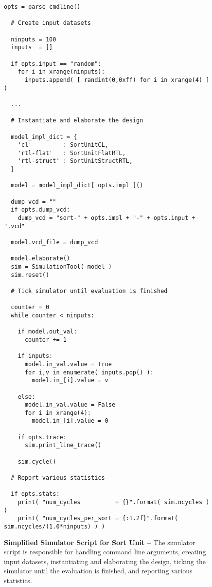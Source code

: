 
\begin{figure}

  \begin{lstlisting}[xleftmargin={0.9in},gobble=2]
  opts = parse_cmdline()

  # Create input datasets

  ninputs = 100
  inputs  = []

  if opts.input == "random":
    for i in xrange(ninputs):
      inputs.append( [ randint(0,0xff) for i in xrange(4) ] )

  ...

  # Instantiate and elaborate the design

  model_impl_dict = {
    'cl'         : SortUnitCL,
    'rtl-flat'   : SortUnitFlatRTL,
    'rtl-struct' : SortUnitStructRTL,
  }

  model = model_impl_dict[ opts.impl ]()

  dump_vcd = ""
  if opts.dump_vcd:
    dump_vcd = "sort-" + opts.impl + "-" + opts.input + ".vcd"

  model.vcd_file = dump_vcd

  model.elaborate()
  sim = SimulationTool( model )
  sim.reset()

  # Tick simulator until evaluation is finished

  counter = 0
  while counter < ninputs:

    if model.out_val:
      counter += 1

    if inputs:
      model.in_val.value = True
      for i,v in enumerate( inputs.pop() ):
        model.in_[i].value = v

    else:
      model.in_val.value = False
      for i in xrange(4):
        model.in_[i].value = 0

    if opts.trace:
      sim.print_line_trace()

    sim.cycle()

  # Report various statistics

  if opts.stats:
    print( "num_cycles          = {}".format( sim.ncycles ) )
    print( "num_cycles_per_sort = {:1.2f}".format( sim.ncycles/(1.0*ninputs) ) )
\end{lstlisting}

  \caption{\textbf{Simplified Simulator Script for Sort Unit --} The
    simulator script is responsible for handling command line arguments,
    creating input datasets, instantiating and elaborating the design,
    ticking the simulator until the evaluation is finished, and reporting
    various statistics.}
  \label{code-tut3-sort-sim}

\end{figure}


